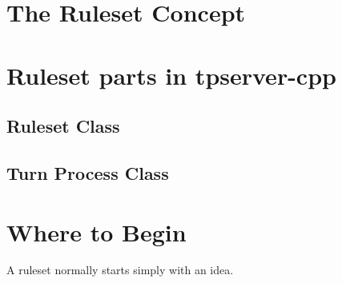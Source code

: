 \documentclass[a4paper,11pt]{report}
\begin{document}
\chapter{The Ruleset Concept}
\label{chap:ruleset-concept}


\chapter{Ruleset parts in tpserver-cpp}
\label{chap:ruleset-parts}

\section{Ruleset Class}
\label{sec:ruleset-class}

\section{Turn Process Class}
\label{sec:turn-process}


\chapter{Where to Begin}
\label{chap:begin}

A ruleset normally starts simply with an idea.
\end{document}
